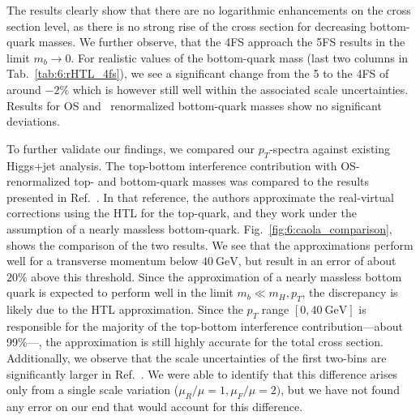 The results clearly show that there are no logarithmic enhancements on the cross section level, as there is no strong rise of the cross section for decreasing bottom-quark masses. We further observe, that the 4\acs{FS} approach the 5\acs{FS} results in the limit $m_b \rightarrow 0$. For realistic values of the bottom-quark mass (last two columns in Tab.~\ref{tab:6:rHTL_4fs}), we see a significant change from the 5 to the 4\acs{FS} of around $-2\%$ which is however still well within the associated scale uncertainties. Results for \acs{OS} and \MS\ renormalized bottom-quark masses show no significant deviations.

To further validate our findings, we compared our $p_T$-spectra against existing Higgs+jet analysis. The top-bottom interference contribution with \acs{OS}-renormalized top- and bottom-quark masses was compared to the results presented in Ref.~\cite{Caola:2018zye}. In that reference, the authors approximate the real-virtual corrections using the \acs{HTL} for the top-quark, and they work under the assumption of a nearly massless bottom-quark. Fig.~\ref{fig:6:caola_comparison}, shows the comparison of the two results. We see that the approximations perform well for a transverse momentum below $40\ \mathrm{GeV}$, but result in an error of about $20\%$ above this threshold. Since the approximation of a nearly massless bottom quark is expected to perform well in the limit $m_b \ll m_H, p_T$, the discrepancy is likely due to the \acs{HTL} approximation. Since the $p_T$ range $[0, 40\ \mathrm{GeV}]$ is responsible for the majority of the top-bottom interference contribution---about 99\%---, the approximation is still highly accurate for the total cross section. Additionally, we observe that the scale uncertainties of the first two-bins are significantly larger in Ref.~\cite{Caola:2018zye}. We were able to identify that this difference arises only from a single scale variation ($\mu_R/\mu = 1, \mu_F/\mu = 2)$, but we have not found any error on our end that would account for this difference.
